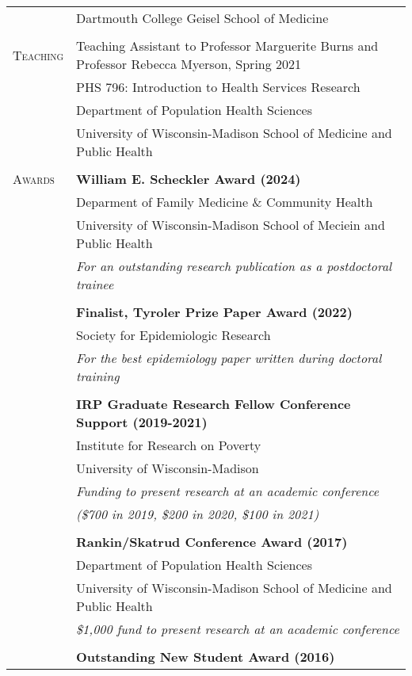 \documentclass[letterpaper,10pt,oneside]{article}
\begin{document}
\begin{longtable}{@{} p{} p{}}
     & Dartmouth College Geisel School of Medicine \\
     & \\
\textsc{Teaching} & Teaching Assistant to Professor Marguerite Burns and Professor Rebecca Myerson, Spring 2021 \\
     & PHS 796: Introduction to Health Services Research \\
     & Department of Population Health Sciences \\
     & University of Wisconsin-Madison School of Medicine and Public Health \\
     & \\
\textsc{Awards} 
     &\textbf{William E. Scheckler Award (2024)} \\
     & Deparment of Family Medicine \& Community Health \\
     & University of Wisconsin-Madison School of Meciein and Public Health \\
     & \textit{For an outstanding research publication as a postdoctoral trainee} \\
     & \\
     &\textbf{Finalist, Tyroler Prize Paper Award (2022)} \\
     & Society for Epidemiologic Research \\
     & \textit{For the best epidemiology paper written during doctoral training} \\
     & \\
     &\textbf{IRP Graduate Research Fellow Conference Support (2019-2021)} \\
     & Institute for Research on Poverty \\
     & University of Wisconsin-Madison \\
     & \textit{Funding to present research at an academic conference} \\
     & \textit{(\$700 in 2019, \$200 in 2020, \$100 in 2021)} \\
     & \\
     &\textbf{Rankin/Skatrud Conference Award (2017)} \\
     & Department of Population Health Sciences \\
     & University of Wisconsin-Madison School of Medicine and Public Health \\
     & \textit{\$1,000 fund to present research at an academic conference} \\
     & \\
     &\textbf{Outstanding New Student Award (2016)} \\

\end{longtable}
\end{document}
